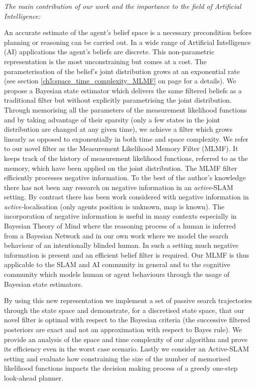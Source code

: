 \textit{The main contribution of our work and the importance to the field of Artificial Intelligence:} 

An accurate estimate of the agent's belief space is a necessary precondition before planning or reasoning can be carried out.
In a wide range of Artificial Intelligence (AI) applications the agent's beliefs are discrete. This non-parametric representation
is the most unconstraining but comes at a cost. The parameterisation of the belief's joint distribution grows at an exponential rate
(see section \ref{ch5:space_time_complexity_MLMF} on page \pageref{ch5:space_time_complexity_MLMF} for a details).
We propose a Bayesian state estimator which delivers the same filtered beliefs as a traditional filter but without explicitly parametrising the 
joint distribution. Through memorising all the parameters of the measurement likelihood functions and by taking advantage of 
their sparsity (only a few states in the joint distribution are changed at any given time), we achieve a filter which grows linearly as opposed to exponentially 
in both time and space complexity. We refer to our novel filter as the Measurement Likelihood Memory Filter (MLMF). 
It keeps track of the history of measurement likelihood functions, referred to as the memory, which 
have been applied on the joint distribution.
The MLMF filter efficiently processes negative information. To the best of the author's knowledge there has not been any research on 
negative information in an \textit{active}-SLAM setting. By contrast there has been work considered with negative information in \textit{active-}localisation (only agents position is unknown, map is known)\citep{NegInfoFurtherStudies}.
The incorporation of negative information is useful in many contexts especially in Bayesian Theory of Mind \citep{Bake_Saxe_Tene_2011}
where the reasoning process of a human is inferred from a Bayesian Network and in our own work \cite{Chambrier2014} where we model the 
search behaviour of an intentionally blinded human. In such a setting much negative information is present and an efficient belief filter is required. 
Our MLMF is thus applicable to the SLAM and AI community in general and to the cognitive community which models human or agent behaviours through 
the usage of Bayesian state estimators.

By using this new representation we implement a set of passive search trajectories through the state 
space and demonstrate, for a discretised state space, that our novel filter is optimal with respect to the Bayesian criteria (the successive
filtered posteriors are exact and not an approximation with respect to Bayes rule). We provide an analysis of the space and time complexity of 
our algorithm and prove its efficiency even in the worst case scenario.
Lastly we consider an Active-SLAM setting and evaluate how constraining the size of the number of memorised likelihood 
functions impacts the decision making process of a greedy one-step look-ahead planner.

